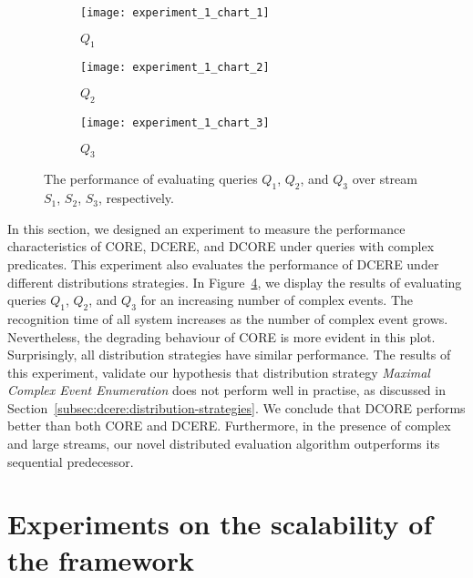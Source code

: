 \begin{figure}[t]
     \begin{adjustbox}{max width=1.5\linewidth,center}
     \centering
     \begin{subfigure}[b]{0.45\textwidth}
         \centering
         \texttt{[image: experiment\_1\_chart\_1]}
         \caption{$Q_{1}$}
         \label{fig:experiment:1:subfigure:1}
     \end{subfigure}
     \hfill
     \begin{subfigure}[b]{0.45\textwidth}
         \centering
         \texttt{[image: experiment\_1\_chart\_2]}
         \caption{$Q_{2}$}
         \label{fig:experiment:1:subfigure:2}
     \end{subfigure}
     \hfill
     \begin{subfigure}[b]{0.45\textwidth}
         \centering
         \texttt{[image: experiment\_1\_chart\_3]}
         \caption{$Q_{3}$}
         \label{fig:experiment:1:subfigure:3}
     \end{subfigure}
     \end{adjustbox}
     \caption{The performance of evaluating queries $Q_{1}$, $Q_{2}$, and $Q_{3}$ over stream $S_{1}$, $S_{2}$, $S_{3}$, respectively.}
     \label{fig:experiment:1}
\end{figure}

In this section, we designed an experiment to measure the performance characteristics of CORE, DCERE, and DCORE under queries with complex predicates. This experiment also evaluates the performance of DCERE under different distributions strategies. In Figure~\ref{fig:experiment:1}, we display the results of evaluating queries $Q_{1}$, $Q_{2}$, and $Q_{3}$ for an increasing number of complex events. The recognition time of all system increases as the number of complex event grows. Nevertheless, the degrading behaviour of CORE is more evident in this plot. Surprisingly, all distribution strategies have similar performance. The results of this experiment, validate our hypothesis that distribution strategy \emph{Maximal Complex Event Enumeration} does not perform well in practise, as discussed in Section~\ref{subsec:dcere:distribution-strategies}. We conclude that DCORE performs better than both CORE and DCERE. Furthermore, in the presence of complex and large streams, our novel distributed evaluation algorithm outperforms its sequential predecessor.

\section{Experiments on the scalability of the framework}\label{sec:scalability}

